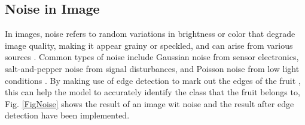 \documentclass[conference]{IEEEtran}
\begin{document}
\subsection{Noise in Image}

In images, noise refers to random variations in brightness or color that degrade image quality, making it appear grainy or speckled, and can arise from various sources \cite{b19}. Common types of noise include Gaussian noise from sensor electronics, salt-and-pepper noise from signal disturbances, and Poisson noise from low light conditions \cite{b19}. By making use of edge detection to mark out the edges of the fruit \cite{b20}, this can help the model to accurately identify the class that the fruit belongs to, Fig. \ref{FigNoise} shows the result of an image wit noise and the result after edge detection have been implemented.
\end{document}
